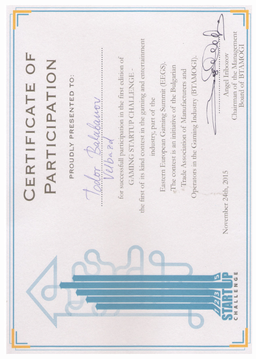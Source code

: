 \documentclass[english,a4paper]{europasscv}
\begin{document}
\includegraphics[width=\textwidth,height=\textheight,keepaspectratio]{EEGS2015}
\end{document}
